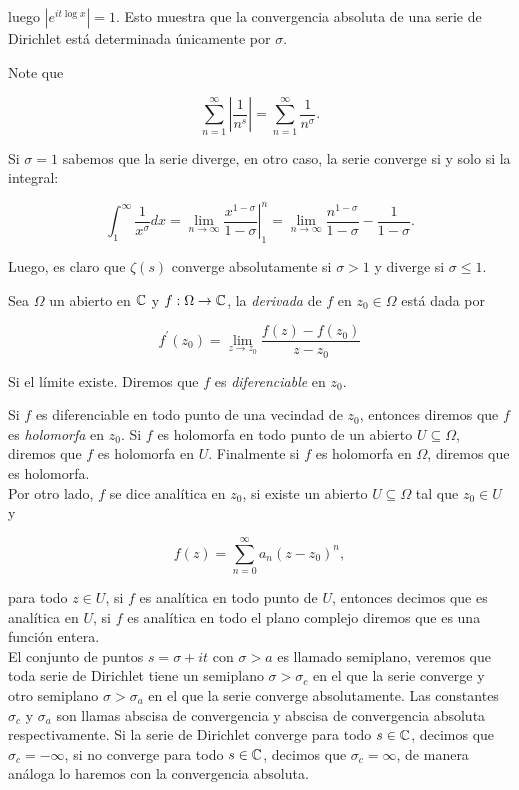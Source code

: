 luego $\left| e^{\displaystyle it\log x}\right|=1$. Esto muestra que la convergencia absoluta de una serie de Dirichlet está determinada únicamente por $\sigma$.

\begin{eg}
Note que

$$\sum_{n=1}^{\infty} \left|\frac{1}{n^s}\right|=\sum_{n=1}^{\infty} \frac{1}{n^{\sigma}}.$$

Si $\sigma=1$ sabemos que la serie diverge, en otro caso, la serie converge si y solo si la integral:

$$\int_1^{\infty}\frac{1}{x^\sigma}dx=\lim_{n \to \infty}\left.\dfrac{x^{1-\sigma}}{1-\sigma}\right|_1^{n}=\lim _{n \rightarrow \infty} \frac{n^{1-\sigma}}{1-\sigma}-\frac{1}{1-\sigma}.$$

Luego, es claro que $\zeta(s)$ converge absolutamente si $\sigma>1$ y diverge  si $\sigma\leq 1$.
\end{eg}

\begin{definition}
Sea $\Omega$ un abierto en $\mathbb{C}$ y $f:\Omega \to \mathbb{C}$, la \textit{derivada} de $f$ en $z_0\in \Omega$ está dada por

$$f^{\prime}(z_0)=\lim_{z \to z_0} \frac{f(z)-f(z_0)}{z-z_0}$$

Si el límite existe. Diremos que $f$ es \textit{diferenciable} en $z_0$.
\end{definition}

Si $f$ es diferenciable en todo punto de una vecindad de $z_0$, entonces diremos que $f$ es \textit{holomorfa} en $z_0$. Si $f$ es holomorfa en todo punto de un abierto $U\subseteq\Omega$, diremos que $f$ es holomorfa en $U$. Finalmente si $f$ es holomorfa en $\Omega$, diremos que es holomorfa.\\

Por otro lado, $f$ se dice analítica en $z_0$, si existe un abierto $U\subseteq \Omega$ tal que $z_0\in U$ y

$$f(z)=\sum_{n=0}^{\infty} a_n (z-z_0)^n,$$

para todo $z\in U$, si $f$ es analítica en todo punto de $U$, entonces decimos que es analítica  en $U$, si $f$ es analítica en todo el plano complejo diremos que es una función entera.\\

El conjunto de puntos $s=\sigma+it$ con $\sigma>a$ es llamado semiplano, veremos que toda serie de Dirichlet tiene un semiplano $\sigma>\sigma_c$ en el que la serie converge y otro semiplano $\sigma>\sigma_a$ en el que la serie converge absolutamente. Las constantes $\sigma_c$ y $\sigma_a$ son llamas abscisa de convergencia y abscisa de convergencia absoluta respectivamente. Si la serie de Dirichlet converge para todo $s\in \mathbb{C}$, decimos que $\sigma_c=-\infty$, si no converge para todo $s\in \mathbb{C}$, decimos que $\sigma_c=\infty$, de manera análoga lo haremos con la convergencia absoluta.\cite{pongsriiam2023analytic}


